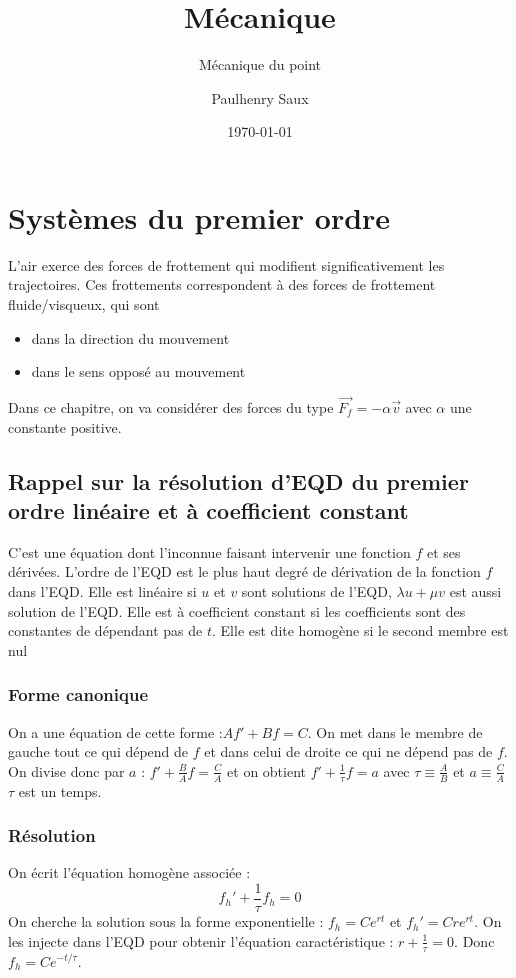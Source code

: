 \documentclass[french]{yLectureNote}
\title{Mécanique}
\subtitle{Mécanique du point}
\author{Paulhenry Saux}
\date{\today}
\renewcommand{\vec}{\overrightarrow}
\begin{document}
\setcounter{chapter}{2}
	\chapter{Systèmes du premier ordre }
L'air exerce des forces de frottement qui modifient significativement les trajectoires. Ces frottements correspondent à des forces de frottement fluide/visqueux, qui sont
\begin{itemize}
\item dans la direction du mouvement
\item dans le sens opposé au mouvement
                                                                                                                                                                    \end{itemize}
Dans ce chapitre, on va considérer des forces du type $\vec{F_f} = -\alpha\vec{v}$ avec $\alpha$ une constante positive.
\section{Rappel sur la résolution d'EQD du premier ordre linéaire et à coefficient constant}
C'est une équation dont l'inconnue faisant intervenir une fonction $f$ et ses dérivées. L'ordre de l'EQD est le plus haut degré de dérivation de la fonction $f$ dans l'EQD. Elle est linéaire si $u$ et $v$ sont solutions de l'EQD, $\lambda u+\mu v$ est aussi solution de l'EQD. Elle est à coefficient constant si les coefficients sont des constantes de dépendant pas de $t$. Elle est dite homogène si le second membre est nul

\subsection{Forme canonique}
On a une équation de cette forme :$Af'+Bf = C$. On met dans le membre de gauche tout ce qui dépend de $f$ et dans celui de droite ce qui ne dépend pas de $f$. On divise donc par $a$ : $f'+\frac{B}{A}f = \frac{C}{A}$ et on obtient $f'+\frac{1}{\tau}f = a$ avec $\tau \equiv \frac{A}{B}$ et $a\equiv \frac{C}{A}$ $\tau$ est un temps.
\subsection{Résolution}
On écrit l'équation homogène associée : \[f_h'+\frac{1}{\tau}f_h = 0\]
On cherche la solution sous la forme exponentielle : $f_h = Ce^{rt}$ et $f_h' = Cre^{rt}$. On les injecte dans l'EQD pour obtenir l'équation caractéristique : $r+\frac{1}{\tau} = 0$. Donc $f_h = Ce^{-t/\tau}$.
\end{document}
